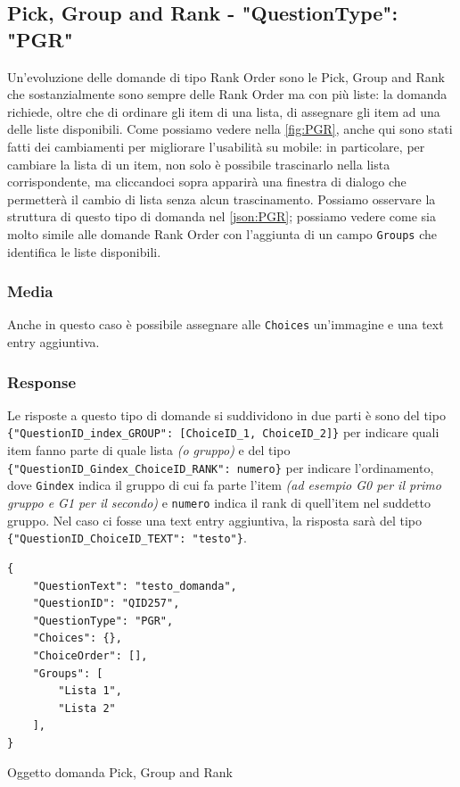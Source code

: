 \clearpage
\subsection{Pick, Group and Rank - "QuestionType": "PGR"}
Un'evoluzione delle domande di tipo Rank Order sono le Pick, Group and Rank che sostanzialmente sono sempre delle Rank Order ma con più liste: la domanda richiede, oltre che di ordinare gli item di una lista, di assegnare gli item ad una delle liste disponibili. Come possiamo vedere nella \autoref{fig:PGR}, anche qui sono stati fatti dei cambiamenti per migliorare l'usabilità su mobile: in particolare, per cambiare la lista di un item, non solo è possibile trascinarlo nella lista corrispondente, ma cliccandoci sopra apparirà una finestra di dialogo che permetterà il cambio di lista senza alcun trascinamento. Possiamo osservare la struttura di questo tipo di domanda nel \autoref{json:PGR}; possiamo vedere come sia molto simile alle domande Rank Order con l'aggiunta di un campo \texttt{Groups} che identifica le liste disponibili.

\subsubsection{Media}
Anche in questo caso è possibile assegnare alle \texttt{Choices} un'immagine e una text entry aggiuntiva.

\subsubsection{Response}
Le risposte a questo tipo di domande si suddividono in due parti è sono del tipo \texttt{\{"QuestionID\_index\_GROUP": [ChoiceID\_1, ChoiceID\_2]\}} per indicare quali item fanno parte di quale lista \textit{(o gruppo)} e del tipo\\ \texttt{\{"QuestionID\_Gindex\_ChoiceID\_RANK": numero\}} per indicare l'ordinamento, dove \texttt{Gindex} indica il gruppo di cui fa parte l'item \textit{(ad esempio G0 per il primo gruppo e G1 per il secondo)} e \texttt{numero} indica il rank di quell'item nel suddetto gruppo.
Nel caso ci fosse una text entry aggiuntiva, la risposta sarà del tipo \texttt{\{"QuestionID\_ChoiceID\_TEXT": "testo"\}}.

\newpage
\begin{json}
\begin{verbatim}
{
    "QuestionText": "testo_domanda",
    "QuestionID": "QID257",
    "QuestionType": "PGR",
    "Choices": {},
    "ChoiceOrder": [],
    "Groups": [
        "Lista 1",
        "Lista 2"
    ],
}
\end{verbatim}
\caption{Oggetto domanda Pick, Group and Rank}
\label{json:PGR}
\end{json}

